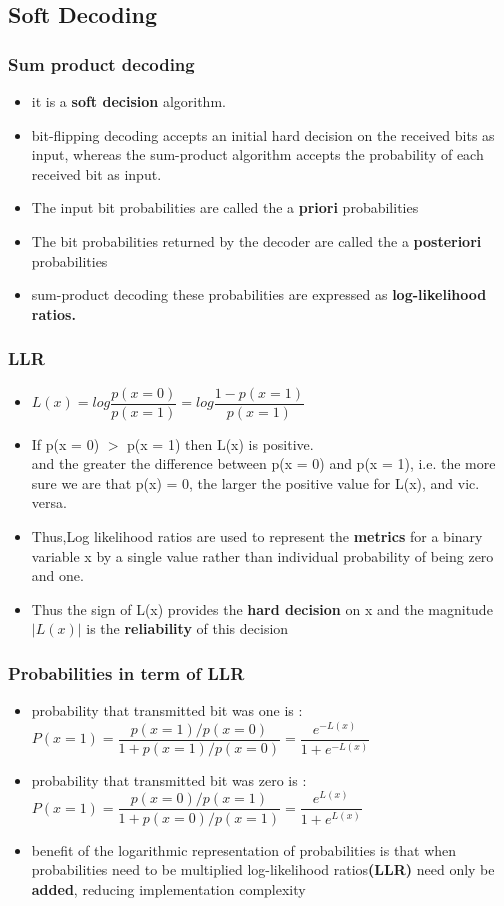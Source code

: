 \documentclass[xcolor=dvipsname]
{beamer}
\begin{document}
 
 \subsection{Soft Decoding}
\begin{frame}[t] 
\frametitle{Sum product decoding}
\begin{itemize}
\item it is a \textbf{soft decision} algorithm.
\item bit-flipping decoding accepts an initial hard decision on
the received bits as input, whereas the sum-product algorithm accepts the probability of each received bit as input.
\item The input bit probabilities are called the a \textbf{priori} probabilities
\item The bit probabilities returned by the decoder are called the a \textbf{posteriori}
probabilities
\item sum-product decoding these probabilities are expressed
as \textbf{log-likelihood ratios.}
\end{itemize}         
\end{frame}


\begin{frame}[t] 
\frametitle{LLR}
\begin{itemize}
\item $ L(x)=log\dfrac{p(x=0)}{p(x=1)}=log\dfrac{1-p(x=1)}{p(x=1)} $
\item If p(x = 0) $>$ p(x = 1) then L(x) is positive.\\
and the greater the difference between p(x = 0) and p(x = 1), i.e. the more
sure we are that p(x) = 0, the larger the positive value for L(x), and vic. versa.
\item Thus,Log likelihood ratios are used to represent the \textbf{metrics} for a binary variable x
by a single value rather than individual probability of being zero and one.
\item Thus
the sign of L(x) provides the \textbf{hard decision} on x and the magnitude $|L(x)|$ is
the \textbf{reliability} of this decision
\end{itemize}         
\end{frame}

\begin{frame}[t] 
\frametitle{Probabilities in term of LLR}
\begin{itemize}
\item probability that transmitted bit was one is : \\
$ P(x=1)=\dfrac{p(x=1)/p(x=0)}{1+p(x=1)/p(x=0)} = \dfrac{e^{-L(x)}}{1+e^{-L(x)}} $
\item probability that transmitted bit was zero is : \\
$ P(x=1)=\dfrac{p(x=0)/p(x=1)}{1+p(x=0)/p(x=1)} = \dfrac{e^{L(x)}}{1+e^{L(x)}} $
\item benefit of the logarithmic representation of probabilities is that when probabilities
need to be multiplied log-likelihood ratios\textbf{(LLR)} need only be \textbf{added}, reducing
implementation complexity
\end{itemize}         
\end{frame}
\end{document}
